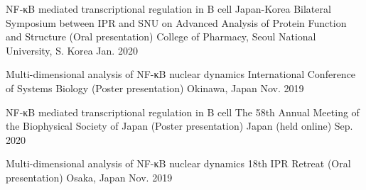

\begin{cventries}

  \cvpres
    {NF-κB mediated transcriptional regulation in B cell} %
    {Japan-Korea Bilateral Symposium between IPR and SNU on Advanced Analysis of Protein Function and Structure (Oral presentation)} %
    {College of Pharmacy, Seoul National University, S. Korea} %
    {Jan. 2020} %


  \cvpres
    {Multi-dimensional analysis of NF-κB nuclear dynamics} %
    {International Conference of Systems Biology (Poster presentation)} %
    {Okinawa, Japan} %
    {Nov. 2019} %


\end{cventries}


\begin{cventries}

  \cvpres
    {NF-κB mediated transcriptional regulation in B cell} %
    {The 58th Annual Meeting of the Biophysical Society of Japan (Poster presentation)} %
    {Japan (held online)} %
    {Sep. 2020} %


  \cvpres
    {Multi-dimensional analysis of NF-κB nuclear dynamics} %
    {18th IPR Retreat (Oral presentation)} %
    {Osaka, Japan} %
    {Nov. 2019} %


\end{cventries}